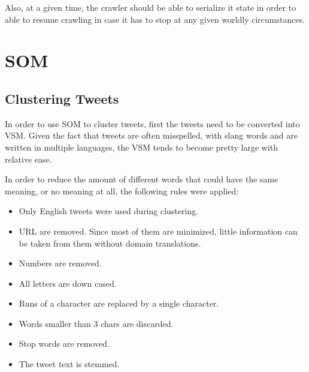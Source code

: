 Also, at a given time, the crawler should be able to serialize it state in order to able to resume crawling in case it has to stop at any given worldly circumstances. 

\section{SOM}

\subsection{Clustering Tweets}
\label{sub:clustering_tweets}

In order to use \ac{SOM} to cluster tweets, first the tweets need to be converted into \ac{VSM}. Given the fact that tweets are often misspelled, with slang words and are written in multiple languages, the \ac{VSM} tends to become pretty large with relative ease. 

In order to reduce the amount of different words that could have the same meaning, or no meaning at all, the following rules were applied:

\begin{itemize}
  \item Only English tweets were used during clustering.
  \item \ac{URL} are removed. Since most of them are minimized, little information can be taken from them without domain translations.
  \item Numbers are removed.
  \item All letters are down cased.
  \item Runs of a character are replaced by a single character.
  \item Words smaller than 3 chars are discarded.
  \item Stop words are removed. 
  \item The tweet text is stemmed.
\end{itemize}

